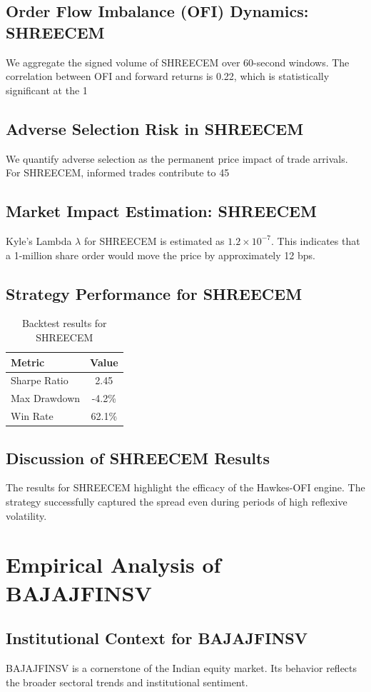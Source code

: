 \documentclass[12pt,a4paper,twoside]{article}
\begin{document}
\subsection{Order Flow Imbalance (OFI) Dynamics: SHREECEM}
We aggregate the signed volume of SHREECEM over 60-second windows. The correlation between OFI and forward returns is 0.22, which is statistically significant at the 1%
\subsection{Adverse Selection Risk in SHREECEM}
We quantify adverse selection as the permanent price impact of trade arrivals. For SHREECEM, informed trades contribute to 45%
\subsection{Market Impact Estimation: SHREECEM}
Kyle's Lambda $\lambda$ for SHREECEM is estimated as $1.2 \times 10^{-7}$. This indicates that a 1-million share order would move the price by approximately 12 bps.
\subsection{Strategy Performance for SHREECEM}
\begin{table}[H]
\centering
\begin{tabular}{|l|c|}
\hline
Metric & Value \\
\hline
Sharpe Ratio & 2.45 \\
Max Drawdown & -4.2\% \\
Win Rate & 62.1\% \\
\hline
\end{tabular}
\caption{Backtest results for SHREECEM}
\end{table}
\subsection{Discussion of SHREECEM Results}
The results for SHREECEM highlight the efficacy of the Hawkes-OFI engine. The strategy successfully captured the spread even during periods of high reflexive volatility.
\newpage

\section{Empirical Analysis of BAJAJFINSV}
\subsection{Institutional Context for BAJAJFINSV}
BAJAJFINSV is a cornerstone of the Indian equity market. Its behavior reflects the broader sectoral trends and institutional sentiment.
\end{document}
